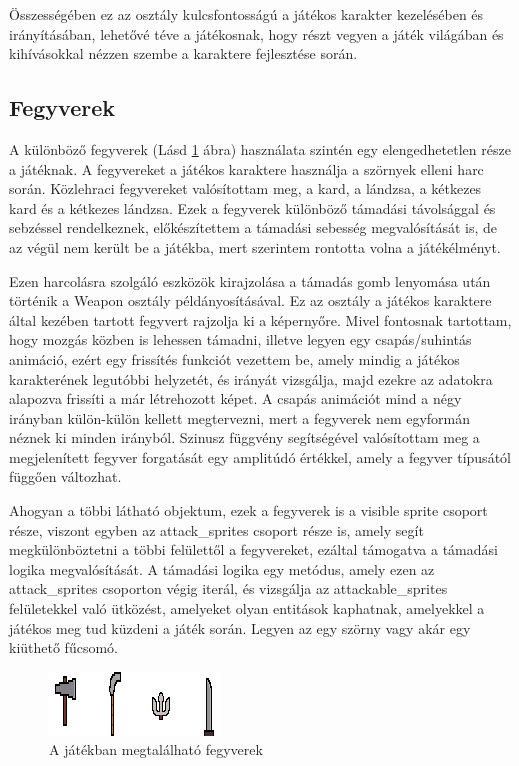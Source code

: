 Összességében ez az osztály kulcsfontosságú a játékos karakter kezelésében és irányításában, lehetővé téve a játékosnak, hogy részt vegyen a játék világában és kihívásokkal nézzen szembe a karaktere fejlesztése során.

\subsection{Fegyverek}

 A különböző fegyverek (Lásd \ref{fig:A játékban megtalálható fegyverek} ábra) használata szintén egy elengedhetetlen része a játéknak. A fegyvereket a játékos karaktere használja a szörnyek elleni harc során. Közlehraci fegyvereket valósítottam meg, a kard, a lándzsa, a kétkezes kard és a kétkezes lándzsa. Ezek a fegyverek különböző támadási távolsággal és sebzéssel rendelkeznek, előkészítettem a támadási sebesség megvalósítását is, de az végül nem került be a játékba, mert szerintem rontotta volna a játékélményt.

Ezen harcolásra szolgáló eszközök kirajzolása a támadás gomb lenyomása után történik a Weapon osztály példányosításával. Ez az osztály a játékos karaktere által kezében tartott fegyvert rajzolja ki a képernyőre. Mivel fontosnak tartottam, hogy mozgás közben is lehessen támadni, illetve legyen egy csapás/suhintás animáció, ezért egy frissítés funkciót vezettem be, amely mindig a játékos karakterének legutóbbi helyzetét, és irányát vizsgálja, majd ezekre az adatokra alapozva frissíti a már létrehozott képet. A csapás animációt mind a négy irányban külön-külön kellett megtervezni, mert a fegyverek nem egyformán néznek ki minden irányból. Szinusz függvény segítségével valósítottam meg a megjelenített fegyver forgatását egy amplitúdó értékkel, amely a fegyver típusától függően változhat.

Ahogyan a többi látható objektum, ezek a fegyverek is a visible sprite csoport része, viszont egyben az attack\_sprites csoport része is, amely segít megkülönböztetni a többi felülettől a fegyvereket, ezáltal támogatva a támadási logika megvalósítását. A támadási logika egy metódus, amely ezen az attack\_sprites csoporton végig iterál, és vizsgálja az attackable\_sprites felületekkel való ütközést, amelyeket olyan entitások kaphatnak, amelyekkel a játékos meg tud küzdeni a játék során. Legyen az egy szörny vagy akár egy kiüthető fűcsomó. 

\begin{figure}[H]
    \centering
    \includegraphics[width=15.5truecm]{images/weapons.png}
    \caption{A játékban megtalálható fegyverek}
    \label{fig:A játékban megtalálható fegyverek}
\end{figure}


